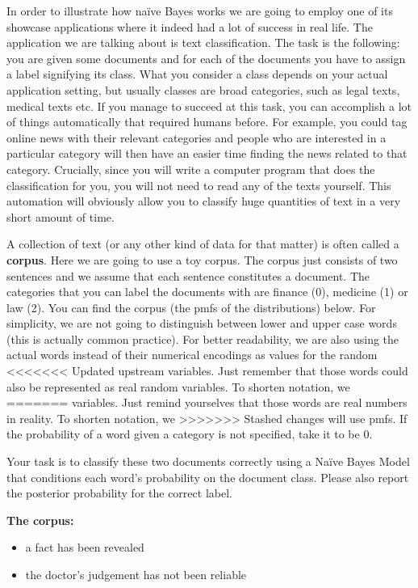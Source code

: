 In order to illustrate how na\"ive Bayes works we are going to employ one of its showcase applications where it indeed had
a lot of success in real life. The application we are talking about is text classification. The task is the following: you
are given some documents and for each of the documents you have to assign a label signifying its class. What you consider
a class depends on your actual application setting, but usually classes are broad categories, such as legal texts, medical
texts etc. If you manage to succeed at this task, you can accomplish a lot of things automatically that required humans before. For example, you could tag online news with their relevant categories and people who are interested in
a particular category will then have an easier time finding the news related to that category. Crucially, since you will
write a computer program that does the classification for you, you will not need to read any of the texts yourself. This automation will obviously allow you to classify huge quantities of text in a very short amount of time.

\begin{Exercise}
A collection of text (or any other kind of data for that matter) is often called a \textbf{corpus}. Here we are going to
use a toy corpus. The corpus just consists of two sentences and we assume that each sentence constitutes
a document.
The categories that you can label the documents with are
finance (0), medicine (1) or law (2). You can find the corpus (the pmfs of the distributions) below. For simplicity, we are not going to distinguish between lower and upper case words (this is actually common practice). For better 
readability, we are also using the actual words instead of their numerical encodings as values for the random 
<<<<<<< Updated upstream
variables. Just remember that those words could also be represented as real random variables. To shorten notation, we
=======
variables. Just remind yourselves that those words are real numbers in reality. To shorten notation, we
>>>>>>> Stashed changes
will use pmfs. If the probability of a word given a category is not specified, take it to be 0.


Your task is to classify these two documents correctly using a Na\"ive Bayes Model that conditions each
word's probability on the document class. Please also report the posterior probability for the correct label. 
\end{Exercise}

\newpage
\textbf{The corpus:}
\begin{itemize}
\item a fact has been revealed
\item the doctor's judgement has not been reliable
\end{itemize}

